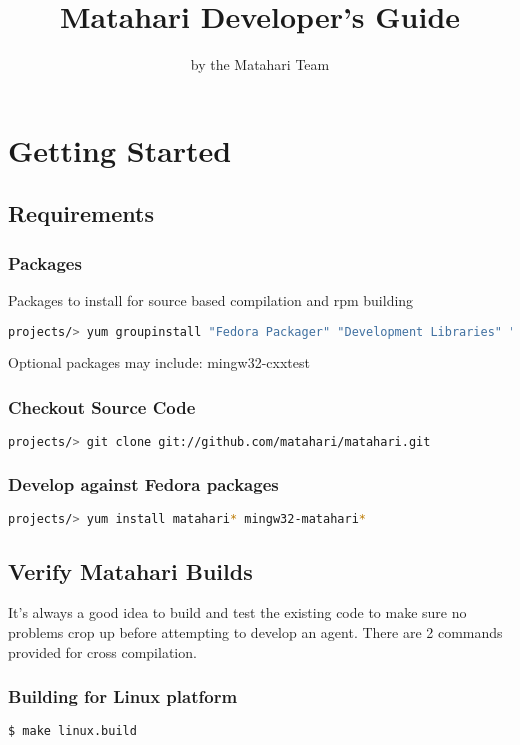 \documentclass[a4paper,12pt]{article}
\author{by the Matahari Team}
\title{Matahari Developer's Guide}
\begin{document}
\maketitle
\newpage
\tableofcontents
\newpage
{}
\section{Getting Started}
\subsection{Requirements}
\subsubsection{Packages}
Packages to install for source based compilation and rpm building
\begin{lstlisting}[language=bash]
projects/> yum groupinstall "Fedora Packager" "Development Libraries" "Development Tools" "MinGW cross-compiler"
\end{lstlisting}
Optional packages may include: mingw32-cxxtest

\subsubsection{Checkout Source Code}
\begin{lstlisting}[language=bash]
projects/> git clone git://github.com/matahari/matahari.git
\end{lstlisting}
\subsubsection{Develop against Fedora packages}
\begin{lstlisting}[language=bash]
projects/> yum install matahari* mingw32-matahari*
\end{lstlisting}
\subsection{Verify Matahari Builds}
It's always a good idea to build and test the existing 
code to make sure no problems crop up before attempting 
to develop an agent. There are 2 commands provided for 
cross compilation.
\subsubsection{Building for Linux platform}
\begin{lstlisting}[language=bash]
$ make linux.build
\end{lstlisting}
\end{document}
